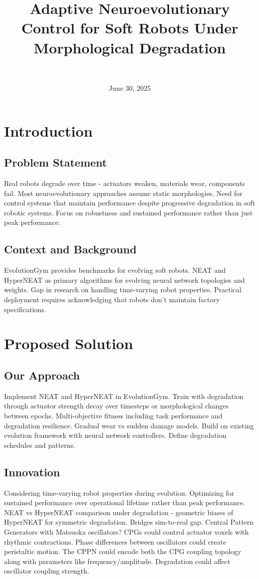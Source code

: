 \documentclass[journal,12pt,onecolumn]{IEEEtran}
\title{Adaptive Neuroevolutionary Control for Soft Robots Under Morphological Degradation}
\author{
   \IEEEauthorblockN{Matthew D. Branson \\ Partner Name} \\
   \IEEEauthorblockA{\textit{Department of Computer Science} \\
   \textit{Missouri State University}\\
   Springfield, MO \\
   branson773@live.missouristate.edu \\
   partner.email@live.missouristate.edu
   }
}
\date{June 30, 2025}
\begin{document}
\maketitle

\section{Introduction}

\subsection{Problem Statement}
Real robots degrade over time - actuators weaken, materials wear, components fail. Most neuroevolutionary approaches assume static morphologies. Need for control systems that maintain performance despite progressive degradation in soft robotic systems. Focus on robustness and sustained performance rather than just peak performance.

\subsection{Context and Background}
EvolutionGym \cite{evogym2021} provides benchmarks for evolving soft robots. NEAT \cite{stanley2002evolving} and HyperNEAT \cite{stanley2009hypercube} as primary algorithms for evolving neural network topologies and weights. Gap in research on handling time-varying robot properties. Practical deployment requires acknowledging that robots don't maintain factory specifications.

\section{Proposed Solution}

\subsection{Our Approach}
Implement NEAT and HyperNEAT in EvolutionGym. Train with degradation through actuator strength decay over timesteps or morphological changes between epochs. Multi-objective fitness including task performance and degradation resilience. Gradual wear vs sudden damage models. Build on existing evolution framework with neural network controllers. Define degradation schedules and patterns.

\subsection{Innovation}
Considering time-varying robot properties during evolution. Optimizing for sustained performance over operational lifetime rather than peak performance. NEAT vs HyperNEAT comparison under degradation - geometric biases of HyperNEAT for symmetric degradation. Bridges sim-to-real gap. Central Pattern Generators with Matsuoka oscillators? CPGs could control actuator voxels with rhythmic contractions. Phase differences between oscillators could create peristaltic motion. The CPPN could encode both the CPG coupling topology along with parameters like frequency/amplitude. Degradation could affect oscillator coupling strength.
\end{document}
